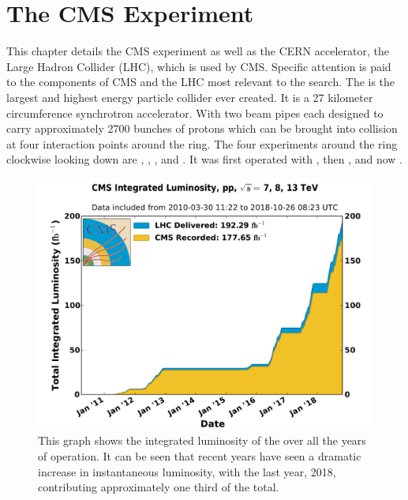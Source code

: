 \chapter{The CMS Experiment}
\label{experiment_chapter}
This chapter details the CMS experiment as well as the CERN accelerator, the Large Hadron Collider (LHC), which is used by CMS. Specific attention is paid to the components of CMS and the LHC most relevant to the \WR search.
The \LHC is the largest and highest energy particle collider ever created.  It is a 27 kilometer circumference synchrotron accelerator.  With two beam pipes each designed to carry approximately 2700 bunches of protons which can be brought into collision at four interaction points around the ring.  The four experiments around the ring clockwise looking down are \ALICE, \CMS, \LHCb, and \ATLAS.  It was first operated with \rootsseven, then \rootseight, and now \rootsthirteen.

\begin{figure}[!htbp]
    \centering
    \includegraphics[width=\textwidth]{figures/int_lumi_allcumulative_pp.pdf}
    \caption[
        Multi-year delivered luminosity of the \LHC
    ]    
    {
        This graph shows the integrated luminosity of the \LHC over all the years of operation.  It can be seen that recent years have seen a dramatic increase in instantaneous luminosity, with the last year, 2018, contributing approximately one third of the total.
    }
    \label{fig:lhc_delv_lumi}

\end{figure}

